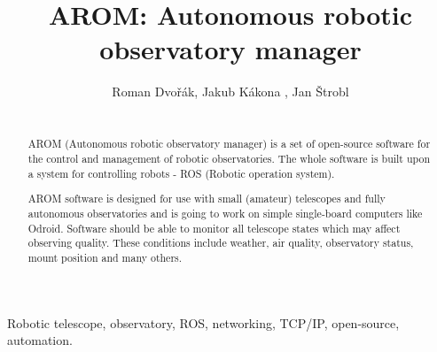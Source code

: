 \documentclass{ibws_template}
\begin{document}

%
\title{AROM: Autonomous robotic observatory manager}
%

%
\author{Roman Dvořák, Jakub Kákona , Jan Štrobl }
%


\maketitle


\begin{abstract}\\
AROM (Autonomous robotic observatory manager) is a set of open-source software for the control and management of robotic observatories. The whole software is built upon a system for controlling robots - ROS (Robotic operation system).

AROM software is designed for use with small (amateur) telescopes and fully autonomous observatories and is going to work on simple single-board computers like Odroid. Software should be able to monitor all telescope states which may affect observing quality. These conditions include weather, air quality, observatory status, mount position and many others.
\end{abstract}


\begin{keywords}
Robotic telescope, observatory, ROS, networking, TCP/IP, open-source, automation.
\end{keywords}
\end{document}
